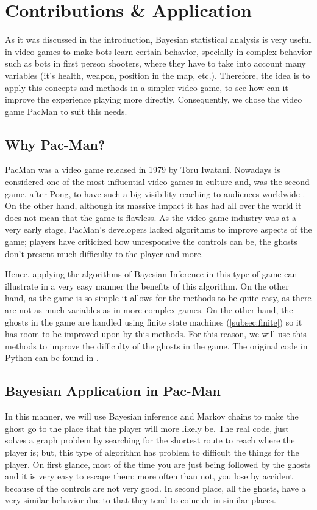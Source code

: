 \section{Contributions \& Application}
As it was discussed in the introduction, Bayesian statistical analysis is very useful in video games to make bots learn certain behavior, specially in complex behavior such as bots in first person shooters, where they have to take into account many variables (it's health, weapon, position in the map, etc.). Therefore, the idea is to apply this concepts and methods in a simpler video game, to see how can it improve the experience playing more directly. Consequently, we chose the video game PacMan to suit this needs.

\subsection{Why Pac-Man?}

PacMan was a video game released in 1979 by Toru Iwatani. Nowadays is considered one of the most influential video games in culture and, was the second game, after Pong, to have such a big visibility reaching to audiences worldwide \cite{pac}. On the other hand, although its massive impact it has had all over the world it does not mean that the game is flawless. As the video game industry was at a very early stage, PacMan's developers lacked algorithms to improve aspects of the game; players have criticized how unresponsive the controls can be, the ghosts don't present much difficulty to the player and more. 

Hence, applying the algorithms of Bayesian Inference in this type of game can illustrate in a very easy manner the benefits of this algorithm. On the other hand, as the game is so simple it allows for the methods to be quite easy, as there are not as much variables as in more complex games. On the other hand, the ghosts in the game are handled using finite state machines (\ref{subsec:finite}) so it has room to be improved upon by this methods. For this reason, we will use this methods to improve the difficulty of the ghosts in the game. The original code in Python can be found in \cite{pac1}.

\subsection{Bayesian Application in Pac-Man}
In this manner, we will use Bayesian inference and Markov chains to make the ghost go to the place that the player will more likely be. The real code, just solves a graph problem by searching for the shortest route to reach where the player is; but, this type of algorithm has problem to difficult the things for the player. On first glance, most of the time you are just being followed by the ghosts and it is very easy to escape them; more often than not, you lose by accident because of the controls are not very good. In second place, all the ghosts, have a very similar behavior due to that they tend to coincide in similar places.


